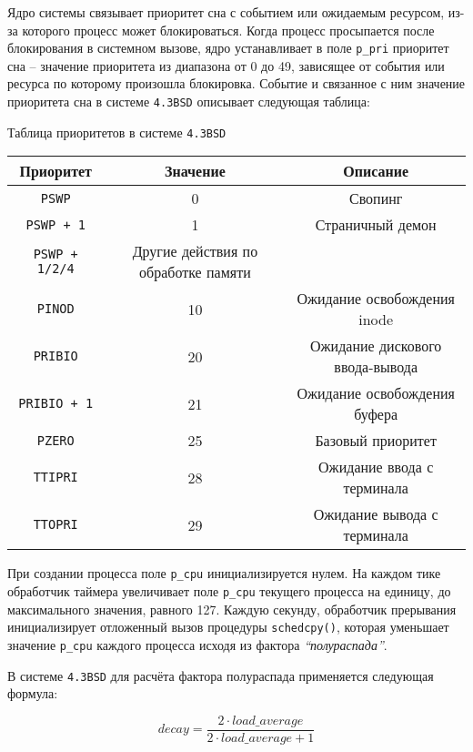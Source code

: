 Ядро системы связывает приоритет сна с событием или ожидаемым ресурсом, из-за которого процесс может блокироваться. Когда процесс просыпается после блокирования в системном вызове, ядро устанавливает в поле \texttt{p\_pri} приоритет сна – значение приоритета из диапазона от 0 до 49, зависящее от события или ресурса по которому произошла блокировка. Событие и связанное с ним значение приоритета сна в системе \texttt{4.3BSD} описывает следующая таблица:

\begin{center}
    \caption{Таблица приоритетов в системе \texttt{4.3BSD}}
    \begin{tabular}{ |c|c|c| }
        \hline
        \textbf{Приоритет} & \textbf{Значение} & \textbf{Описание} \\
        \hline
        \texttt{PSWP} & 0 & Свопинг \\
        \hline
        \texttt{PSWP + 1} & 1 & Страничный демон \\
        \hline
        \texttt{PSWP + 1/2/4} & Другие действия по обработке памяти \\
        \hline
        \texttt{PINOD} & 10 & Ожидание освобождения inode \\
        \hline
        \texttt{PRIBIO} & 20 & Ожидание дискового ввода-вывода \\
        \hline
        \texttt{PRIBIO + 1} & 21 & Ожидание освобождения буфера \\
        \hline
        \texttt{PZERO} & 25 & Базовый приоритет \\
        \hline
        \texttt{TTIPRI} & 28 & Ожидание ввода с терминала \\
        \hline
        \texttt{TTOPRI} & 29 & Ожидание вывода с терминала \\
        \hline
    \end{tabular}
\end{center}

При создании процесса поле \texttt{p\_cpu} инициализируется нулем. На каждом тике обработчик таймера увеличивает поле \texttt{p\_cpu} текущего процесса на единицу, до максимального значения, равного 127. Каждую секунду, обработчик прерывания инициализирует отложенный вызов процедуры \texttt{schedcpy()}, которая уменьшает значение \texttt{p\_cpu} каждого процесса исходя из фактора \textit{``полураспада''}.

В системе \texttt{4.3BSD} для расчёта фактора полураспада применяется следующая формула:

\begin{equation}
    decay = \frac{2 \cdot load\_average}{2 \cdot load\_average + 1}
\end{equation}

